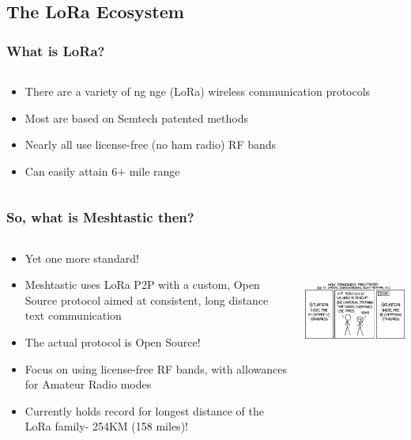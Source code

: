 \documentclass[aspectratio=169]{beamer}
\begin{document}
\subsection{The LoRa Ecosystem}
\frame{\subsectionpage}

\begin{frame}[fragile]
  \frametitle{What is LoRa?}
  \begin{columns}[]
    \begin{column}[T]{0.45\paperwidth}
      \begin{itemize}%
        \item{There are a variety of \color{red}{Lo}\color{black}ng \color{red}{Ra}\color{black}nge (LoRa) wireless communication protocols}
        \item{Most are based on Semtech patented methods}
        \item{Nearly all use license-free (no ham radio) RF bands}
        \item{Can easily attain 6+ mile range}
     \end{itemize}
    \end{column}
    \begin{column}[T]{0.45\paperwidth}
    \end{column}
  \end{columns}
\end{frame}

\begin{frame}[fragile]
  \frametitle{So, what is Meshtastic then?}
  \begin{columns}[]
    \begin{column}[T]{0.45\paperwidth}
      \begin{itemize}%
        \item{Yet one more standard!}
        \item{Meshtastic uses LoRa P2P with a custom, Open Source protocol aimed at consistent, long distance text communication}
        \item{The actual protocol is Open Source!}
        \item{Focus on using license-free RF bands, with allowances for Amateur Radio modes}
        \item{Currently holds record for longest distance of the LoRa family- 254KM (158 miles)!}
     \end{itemize}
    \end{column}
    \begin{column}[T]{0.45\paperwidth}
      \includegraphics[height=4cm,keepaspectratio]{images/standards.png}
    \end{column}
  \end{columns}
\end{frame}
\end{document}
